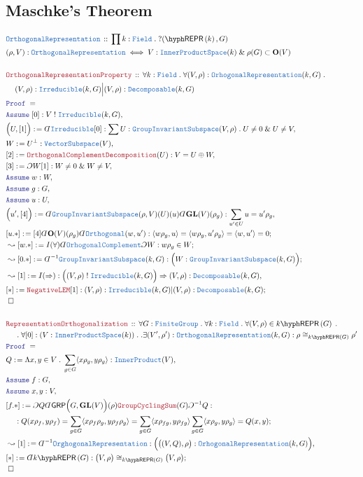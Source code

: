 \documentclass[12pt]{scrartcl}%
\newcommand{\TYPE}[1]{\textcolor{NavyBlue}{\mathtt{#1}}}%
\newcommand{\LOGIC}[1]{\textcolor{Blue}{\mathtt{#1}}}%
\newcommand{\THM}[1]{\textcolor{Maroon}{\mathtt{#1}}}%
\renewcommand{\.}{\; . \;} %
\newcommand{\de}{: \kern 0.1pc =} %
\newcommand{\IsNot}{\; ! \;} %
\newcommand{\Theorem}[2]{& \THM{#1} \, :: \, #2 \\ & \Proof = \\ } %
\newcommand{\DeclareType}[2]{& \TYPE{#1} \, :: \, #2 \\}%
\newcommand{\DefineType}[3]{& #1 : \TYPE{#2} \iff #3 \\}%
\newcommand{\NewLine}{\\ & \kern 1pc}%
\newcommand{\Page}[1]{ \begin{align*} #1 \end{align*}  }%
\newcommand{ \bd }{ \ByDef }%
\renewcommand{\And}{\; \& \;}%
\newcommand{\Imply}{\Rightarrow}
\newcommand{\Say}[3]{& #1 \de #2 : #3, \\} %
\newcommand{\Conclude}[3]{& #1 \de #2 : #3; \\}%
\newcommand{\Derive}[3]{& \leadsto #1 \de #2 : #3, \\} %
\newcommand{\DeriveConclude}[3]{& \leadsto #1 \de #2 : #3 ; \\} %
\newcommand{\Assume}[2]{& \LOGIC{Assume} \; #1 : #2, \\} %
\newcommand{\QED}{\; \square} %
\newcommand{\EndProof}{& \QED \\} %
\newcommand{\ByDef}{\rotatebox[origin=c]{-180}{$D$}}%
\newcommand{\ByConstr}{\rotatebox[origin=c]{-180}{$C$}}%
\newcommand{\Proof}{\LOGIC{Proof} \; } %
\newcommand{\FG}{\TYPE{FiniteGroup}} %
\newcommand{\GIS}{\TYPE{GroupInvariantSubspace}}
\newcommand{\GRP}{\mathsf{GRP}} %
\newcommand{\REPR}[2]{#1\hyph\mathsf{REPR}\left(#2\right)}
\newcommand{\GL}{\mathbf{GL}}%
\newcommand{\IPS}{\TYPE{InnerProductSpace}}
\renewcommand{\O}{\mathbf{O}}
\newcommand{\Field}{\TYPE{Field}}
\begin{document}
\subsection{Maschke's Theorem}
\Page{
	\DeclareType{OrthogonalRepresentation}
	{
		\prod k : \Field \.
		?\REPR(k,G) 
	}
	\DefineType{ (\rho,V)  }
	{
		OrthogonalRepresentation
	}
	{
	 V : \IPS(k) \And \rho(G) \subset \O(V)  
	}
	\\
	\Theorem{OrthogonalRepresentationProperty}
	{
		\forall k : \Field \.
		\forall (V,\rho) : \TYPE{OrhogonalRepresentation}(k,G) \.
		\NewLine 
		(V,\rho) : \TYPE{Irreducible}(k,G) 
		\Big| 
		(V,\rho) : \TYPE{Decomposable}(k,G)
	}
	\Assume{[0]}{V \IsNot \TYPE{Irreducible}(k,G)}
	\Say{\Big(U,[1]\Big)}
	{ 
		\bd \TYPE{Irreducible}[0]
	}
	{
		\sum U : \GIS(V,\rho) \.
		U \neq 0 \And U \neq V
	}
	\Say{W}{U^\bot}{\TYPE{VectorSubspace}(V)}
	\Say{[2]}{\THM{OrthogonalComplementDecomposition}(U) }
	{ V = U \oplus W }
	\Say{[3]}{\ByConstr W [1]}{ W \neq 0 \And W \neq V}
	\Assume{w}{W}
	\Assume{g}{G}
	\Assume{u}{U}
	\Say{\Big(u',[4]\Big)}
	{
		\bd \GIS(\rho,V)(U)(u)\bd \GL(V)(\rho_g)	
	}
	{
		\sum_{u' \in U} u = u' \rho_g 
	}
	\Conclude{[u.*]}
	{  [4] \bd \O(V)(\rho_g) \bd \TYPE{Orthogonal}(w,u')  }
	{
		\langle w \rho_g , u \rangle = 
		\langle w \rho_g, u' \rho_g \rangle  = 
		\langle w, u' \rangle = 
		0
	} 
	\DeriveConclude{[w.*]}{
		I(\forall)
		\bd \TYPE{OrhogonalComplement}
		\ByConstr W 
	}
	{w\rho_g \in W }
	\DeriveConclude{[0.*]}{\bd^{-1} \GIS(k,G)}
	{
		\Big( W :  \GIS(k,G) \Big) 
	}
	\Derive{[1]}{I(\Imply)}
	{
		\Big((V,\rho) \IsNot \TYPE{Irreducible}(k,G)\Big)
			\Imply 
			(V,\rho) : \TYPE{Decomposable}(k,G)
	} 
	\Conclude{[*]}{\THM{NegativeLEM}[1]}
	{
		(V,\rho) : \TYPE{Irreducible}(k,G) |
		(V,\rho) : \TYPE{Decomposable}(k,G)
	}
	\EndProof
	\\
	\Theorem{RepresentationOrthogonalization}
	{
		\forall G : \FG \.
		\forall k : \Field \.
		\forall (V,\rho) \in \REPR{k}{G} \. \NewLine \. 
		\forall [0] : (V : \IPS(k)) \. .
		\exists  (V',\rho') : \TYPE{OrthogonalRepresentation}(k,G) :
		\rho \cong_{\REPR{k}{G}} \rho'
	}
	\Say{Q}{
		\Lambda x,y \in V \. 
		\sum_{g \in G} 
		\langle x \rho_g, y \rho_g \rangle 
	}
	{ \TYPE{InnerProduct}(V) }
	\Assume{f}{G}
	\Assume{x,y}{V}
	\Conclude{[f.*]}
	{
		\ByConstr Q
		\bd \GRP\Big( G, \GL(V) \Big)(\rho)
		\THM{GroupCyclingSum}(G)
		\ByConstr^{-1} Q
	}
	{
		\NewLine :
		Q(x \rho_f,y \rho_f) = 
		\sum_{g \in G} 
		\langle x \rho_f \rho_g, y \rho_f \rho_g \rangle =
		\sum_{g \in G}
		\langle x \rho_{fg}, y \rho_{fg} \rangle
		\sum_{g \in G}
		\langle x \rho_{g}, y \rho_{g} \rangle =
		Q(x,y)
	}
	\Derive{[1]}{\bd^{-1} \TYPE{OrghogonalRepresentation}}
	{
		\Big( 
			\big( (V,Q),\rho\big) : 
			\TYPE{OrhogonalRepresentation}(k,G) 
		\Big) 
	}
	\Conclude{[*]}{\bd \REPR{k}{G}}
	{
			\big( V, \rho\big) \cong_{\REPR{k}{G}}
			\big(V, \rho \big) 
	}
	\EndProof
}
\end{document}
